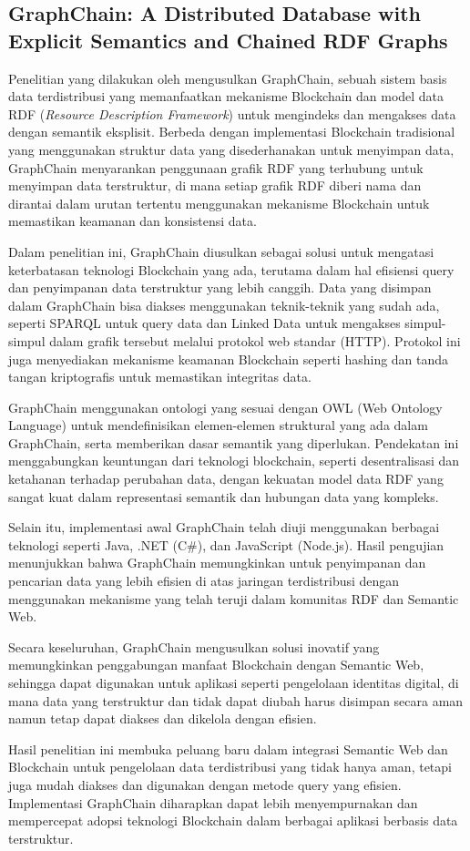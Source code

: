\subsection{GraphChain: A Distributed Database with Explicit Semantics and Chained RDF Graphs}
\label{subsec:graphchain}

Penelitian yang dilakukan oleh \cite{sopek2018graphchain} mengusulkan GraphChain, sebuah sistem basis data terdistribusi yang memanfaatkan mekanisme Blockchain dan model data RDF (\textit{Resource Description Framework}) untuk mengindeks dan mengakses data dengan semantik eksplisit. Berbeda dengan implementasi Blockchain tradisional yang menggunakan struktur data yang disederhanakan untuk menyimpan data, GraphChain menyarankan penggunaan grafik RDF yang terhubung untuk menyimpan data terstruktur, di mana setiap grafik RDF diberi nama dan dirantai dalam urutan tertentu menggunakan mekanisme Blockchain untuk memastikan keamanan dan konsistensi data.

Dalam penelitian ini, GraphChain diusulkan sebagai solusi untuk mengatasi keterbatasan teknologi Blockchain yang ada, terutama dalam hal efisiensi query dan penyimpanan data terstruktur yang lebih canggih. Data yang disimpan dalam GraphChain bisa diakses menggunakan teknik-teknik yang sudah ada, seperti SPARQL untuk query data dan Linked Data untuk mengakses simpul-simpul dalam grafik tersebut melalui protokol web standar (HTTP). Protokol ini juga menyediakan mekanisme keamanan Blockchain seperti hashing dan tanda tangan kriptografis untuk memastikan integritas data.

GraphChain menggunakan ontologi yang sesuai dengan OWL (Web Ontology Language) untuk mendefinisikan elemen-elemen struktural yang ada dalam GraphChain, serta memberikan dasar semantik yang diperlukan. Pendekatan ini menggabungkan keuntungan dari teknologi blockchain, seperti desentralisasi dan ketahanan terhadap perubahan data, dengan kekuatan model data RDF yang sangat kuat dalam representasi semantik dan hubungan data yang kompleks.

Selain itu, implementasi awal GraphChain telah diuji menggunakan berbagai teknologi seperti Java, .NET (C\#), dan JavaScript (Node.js). Hasil pengujian menunjukkan bahwa GraphChain memungkinkan untuk penyimpanan dan pencarian data yang lebih efisien di atas jaringan terdistribusi dengan menggunakan mekanisme yang telah teruji dalam komunitas RDF dan Semantic Web.

Secara keseluruhan, GraphChain mengusulkan solusi inovatif yang memungkinkan penggabungan manfaat Blockchain dengan Semantic Web, sehingga dapat digunakan untuk aplikasi seperti pengelolaan identitas digital, di mana data yang terstruktur dan tidak dapat diubah harus disimpan secara aman namun tetap dapat diakses dan dikelola dengan efisien.

Hasil penelitian ini membuka peluang baru dalam integrasi Semantic Web dan Blockchain untuk pengelolaan data terdistribusi yang tidak hanya aman, tetapi juga mudah diakses dan digunakan dengan metode query yang efisien. Implementasi GraphChain diharapkan dapat lebih menyempurnakan dan mempercepat adopsi teknologi Blockchain dalam berbagai aplikasi berbasis data terstruktur.